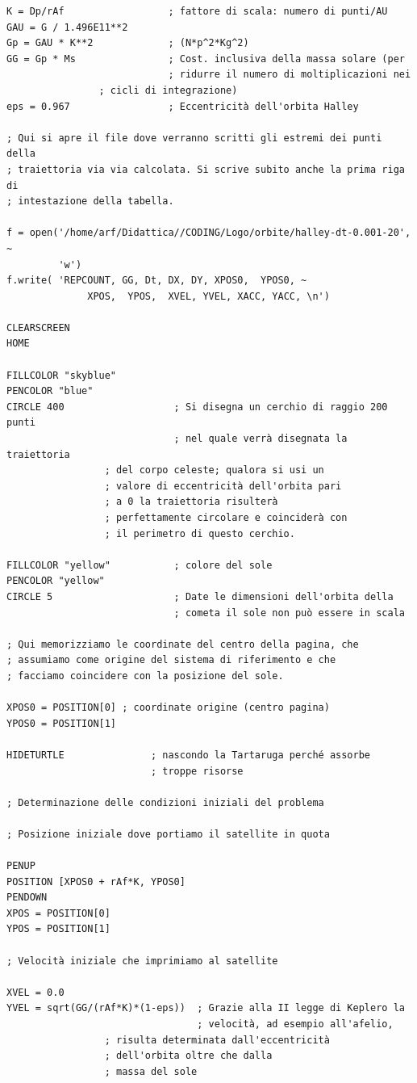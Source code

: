 \begin{lstlisting}[frame=single]
K = Dp/rAf                  ; fattore di scala: numero di punti/AU
GAU = G / 1.496E11**2 
Gp = GAU * K**2             ; (N*p^2*Kg^2)
GG = Gp * Ms                ; Cost. inclusiva della massa solare (per 
                            ; ridurre il numero di moltiplicazioni nei 
			    ; cicli di integrazione)
eps = 0.967                 ; Eccentricità dell'orbita Halley

; Qui si apre il file dove verranno scritti gli estremi dei punti della
; traiettoria via via calcolata. Si scrive subito anche la prima riga di
; intestazione della tabella.

f = open('/home/arf/Didattica//CODING/Logo/orbite/halley-dt-0.001-20', ~
         'w')
f.write( 'REPCOUNT, GG, Dt, DX, DY, XPOS0,  YPOS0, ~
              XPOS,  YPOS,  XVEL, YVEL, XACC, YACC, \n')

CLEARSCREEN
HOME

FILLCOLOR "skyblue"
PENCOLOR "blue"
CIRCLE 400                   ; Si disegna un cerchio di raggio 200 punti
                             ; nel quale verrà disegnata la traiettoria
			     ; del corpo celeste; qualora si usi un 
			     ; valore di eccentricità dell'orbita pari 
			     ; a 0 la traiettoria risulterà 
			     ; perfettamente circolare e coinciderà con
			     ; il perimetro di questo cerchio.

FILLCOLOR "yellow"           ; colore del sole
PENCOLOR "yellow"
CIRCLE 5                     ; Date le dimensioni dell'orbita della 
                             ; cometa il sole non può essere in scala

; Qui memorizziamo le coordinate del centro della pagina, che 
; assumiamo come origine del sistema di riferimento e che 
; facciamo coincidere con la posizione del sole.

XPOS0 = POSITION[0] ; coordinate origine (centro pagina)
YPOS0 = POSITION[1]

HIDETURTLE               ; nascondo la Tartaruga perché assorbe 
                         ; troppe risorse

; Determinazione delle condizioni iniziali del problema

; Posizione iniziale dove portiamo il satellite in quota

PENUP
POSITION [XPOS0 + rAf*K, YPOS0]
PENDOWN
XPOS = POSITION[0]
YPOS = POSITION[1]

; Velocità iniziale che imprimiamo al satellite

XVEL = 0.0
YVEL = sqrt(GG/(rAf*K)*(1-eps))  ; Grazie alla II legge di Keplero la 
                                 ; velocità, ad esempio all'afelio, 
				 ; risulta determinata dall'eccentricità 
				 ; dell'orbita oltre che dalla 
				 ; massa del sole


\end{lstlisting}
